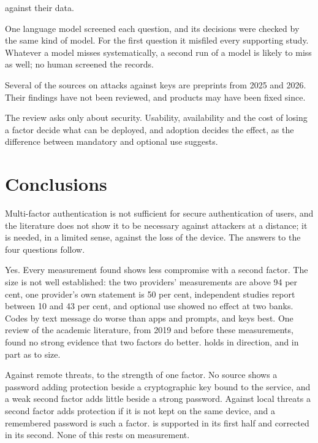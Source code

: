 \begin{description}
    against their data.
  \item[Screening] One language model screened each question, and its
    decisions were checked by the same kind of model.
    For the first question it misfiled every supporting study.
    Whatever a model misses systematically, a second run of a model is
    likely to miss as well; no human screened the records.
  \item[Recency] Several of the sources on attacks against keys are
    preprints from 2025 and 2026.
    Their findings have not been reviewed, and products may have been
    fixed since.
  \item[Unmeasured dimensions] The review asks only about security.
    Usability, availability and the cost of losing a factor decide what
    can be deployed, and adoption decides the effect, as the difference
    between mandatory and optional use suggests.
\end{description}


\section{Conclusions}\label{sec:conclusions}

Multi-factor authentication is not sufficient for secure authentication
of users, and the literature does not show it to be necessary against
attackers at a distance; it is needed, in a limited sense, against the
loss of the device.
The answers to the four questions follow.

\rqeffect*
Yes.
Every measurement found shows less compromise with a second factor.
The size is not well established: the two providers' measurements are
above 94 per cent, one provider's own statement is 50 per cent,
independent studies report between 10 and 43 per cent, and optional use
showed no effect at two banks.
Codes by text message do worse than apps and prompts, and keys best.
One review of the academic literature, from 2019 and before these
measurements, found no strong evidence that two factors do better.
 holds in direction, and in part as to size.

\rqattribution*
Against remote threats, to the strength of one factor.
No source shows a password adding protection beside a cryptographic key
bound to the service, and a weak second factor adds little beside a
strong password.
Against local threats a second factor adds protection if it is not kept
on the same device, and a remembered password is such a factor.
 is supported in its first half and corrected in
its second.
None of this rests on measurement.

